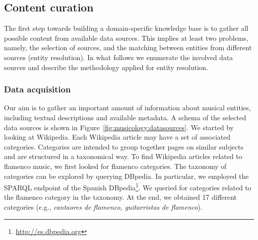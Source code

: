 \subsection{Content curation}
\label{sec:musicology:kb_curation}

The first step towards building a domain-specific knowledge base is to gather all possible content from available data sources. This implies at least two problems, namely, the selection of sources, and the matching between entities from different sources (entity resolution). In what follows we enumerate the involved data sources and describe the methodology applied for entity resolution.

\subsubsection{Data acquisition}
\label{sec:musicology:datasoruces}

Our aim is to gather an important amount of information about musical entities, including textual descriptions and available metadata. A schema of the selected data sources is shown in Figure~\ref{fig:musicology:datasources}. We started by looking at Wikipedia.%
Each Wikipedia article may have a set of associated categories. Categories are intended to group together pages on similar subjects and are structured in a taxonomical way. To find Wikipedia articles related to flamenco music, we first looked for flamenco categories. The taxonomy of categories can be explored by querying DBpedia. %
In particular, we employed the SPARQL endpoint of the Spanish DBpedia\footnote{\url{http://es.dbpedia.org}}. We queried for categories related to the flamenco category in the taxonomy. At the end, we obtained 17 different categories (e.g., \textit{cantaores de flamenco, guitarristas de flamenco}).

